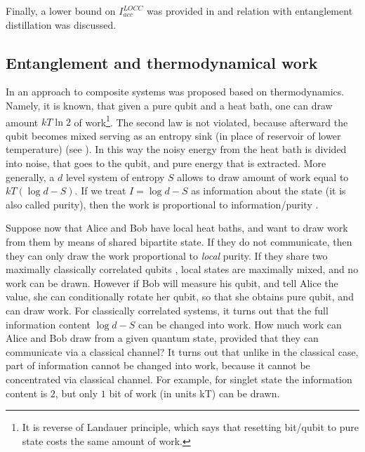 \documentclass[twocolumn,aps,rmp]{revtex4}
\begin{document}
Finally, a lower bound on $I_{acc}^{LOCC}$ was provided in
\cite{SenSL2006-Ilocc-bound} and relation with entanglement
distillation was discussed.



\subsection{Entanglement and thermodynamical work}
\label{sec:delta}

In \cite{OHHH2001} an approach to composite systems was proposed based
on thermodynamics. Namely, it is known, that given a pure qubit and a
heat bath, one can draw amount $kT\ln 2$ of work\footnote{It is
  reverse of Landauer principle, which says that resetting bit/qubit
  to pure state costs the same amount of work.}. The second law is not
violated, because afterward the qubit becomes mixed serving as an
entropy sink (in place of reservoir of lower temperature) (see
\cite{Vedral1999,Scully-negentropy,silnik}).  In this way the noisy
energy from the heat bath is divided into noise, that goes to the
qubit, and pure energy that is extracted.  More generally, a $d$ level
system of entropy $S$ allows to draw amount of work equal to $kT (\log
d -S)$. If we treat $I=\log d -S$ as information about the state (it
is also called purity), then the work is proportional to
information/purity \cite{igor-deficit}.


Suppose now that Alice and Bob have local heat baths, and want to draw
work from them by means of shared bipartite state. If they do not
communicate, then they can only draw the work proportional to {\it
  local} purity. If they share two maximally classically correlated
qubits ,
local states are maximally mixed, and no work can be
drawn. However if Bob will measure his qubit, and tell Alice the
value, she can conditionally rotate her qubit, so that she obtains
pure qubit, and can draw work. For classically correlated systems, it
turns out that the full information content $\log d -S$ can be changed
into work. How much work can Alice and Bob draw from a given quantum
state, provided that they can communicate via a classical channel? It
turns out that unlike in the classical case, part of information
cannot be changed into work, because it cannot be concentrated via
classical channel. For example, for singlet state the information
content is $2$, but only $1$ bit of work (in units kT) can be drawn.
\end{document}
